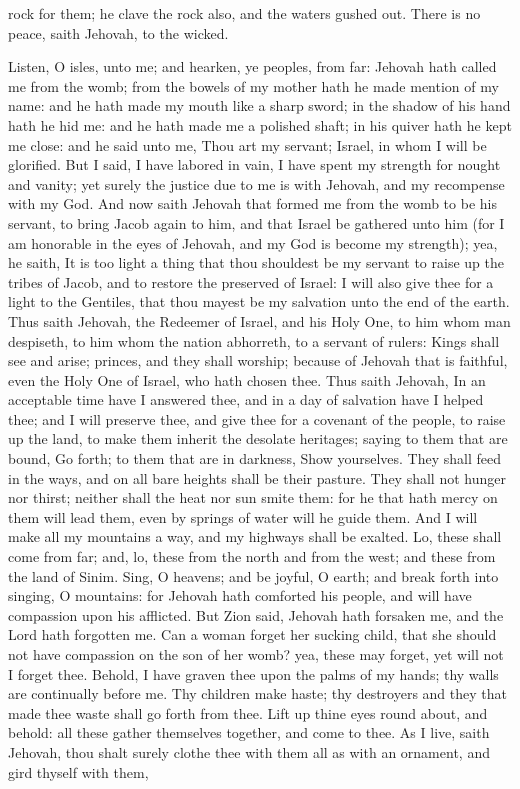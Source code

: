 rock for them; he clave the rock also, and the waters gushed out. There is no peace, saith Jehovah, to the wicked. 

Listen, O isles, unto me; and hearken, ye peoples, from far: Jehovah hath called me from the womb; from the bowels of my mother hath he made mention of my name: and he hath made my mouth like a sharp sword; in the shadow of his hand hath he hid me: and he hath made me a polished shaft; in his quiver hath he kept me close: and he said unto me, Thou art my servant; Israel, in whom I will be glorified. But I said, I have labored in vain, I have spent my strength for nought and vanity; yet surely the justice due to me is with Jehovah, and my recompense with my God.  And now saith Jehovah that formed me from the womb to be his servant, to bring Jacob again to him, and that Israel be gathered unto him (for I am honorable in the eyes of Jehovah, and my God is become my strength); yea, he saith, It is too light a thing that thou shouldest be my servant to raise up the tribes of Jacob, and to restore the preserved of Israel: I will also give thee for a light to the Gentiles, that thou mayest be my salvation unto the end of the earth. Thus saith Jehovah, the Redeemer of Israel, and his Holy One, to him whom man despiseth, to him whom the nation abhorreth, to a servant of rulers: Kings shall see and arise; princes, and they shall worship; because of Jehovah that is faithful, even the Holy One of Israel, who hath chosen thee.  Thus saith Jehovah, In an acceptable time have I answered thee, and in a day of salvation have I helped thee; and I will preserve thee, and give thee for a covenant of the people, to raise up the land, to make them inherit the desolate heritages; saying to them that are bound, Go forth; to them that are in darkness, Show yourselves. They shall feed in the ways, and on all bare heights shall be their pasture. They shall not hunger nor thirst; neither shall the heat nor sun smite them: for he that hath mercy on them will lead them, even by springs of water will he guide them. And I will make all my mountains a way, and my highways shall be exalted. Lo, these shall come from far; and, lo, these from the north and from the west; and these from the land of Sinim. Sing, O heavens; and be joyful, O earth; and break forth into singing, O mountains: for Jehovah hath comforted his people, and will have compassion upon his afflicted.  But Zion said, Jehovah hath forsaken me, and the Lord hath forgotten me. Can a woman forget her sucking child, that she should not have compassion on the son of her womb? yea, these may forget, yet will not I forget thee. Behold, I have graven thee upon the palms of my hands; thy walls are continually before me. Thy children make haste; thy destroyers and they that made thee waste shall go forth from thee. Lift up thine eyes round about, and behold: all these gather themselves together, and come to thee. As I live, saith Jehovah, thou shalt surely clothe thee with them all as with an ornament, and gird thyself with them, 